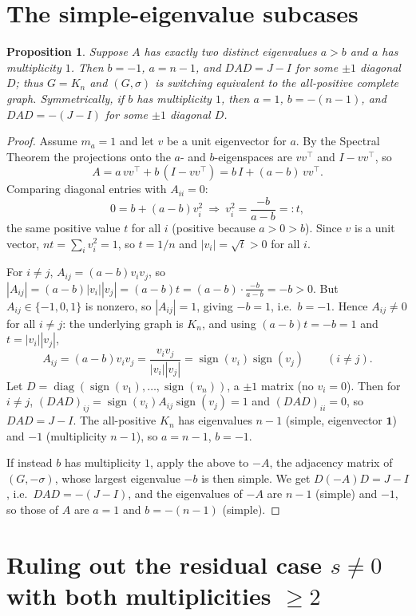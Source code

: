\documentclass{amsart}
\newtheorem{proposition}{Proposition}
\theoremstyle{definition}
\begin{document}
\section{The simple-eigenvalue subcases}\label{sec:simple}

\begin{proposition}\label{prop:simple}
Suppose $A$ has exactly two distinct eigenvalues $a>b$ and $a$ has
multiplicity $1$. Then $b=-1$, $a=n-1$, and $DAD=J-I$ for some $\pm1$ diagonal
$D$; thus $G=K_n$ and $(G,\sigma)$ is switching equivalent to the all-positive
complete graph. Symmetrically, if $b$ has multiplicity $1$, then $a=1$,
$b=-(n-1)$, and $DAD=-(J-I)$ for some $\pm1$ diagonal $D$.
\end{proposition}

\begin{proof}
Assume $m_a=1$ and let $v$ be a unit eigenvector for $a$. By the Spectral
Theorem the projections onto the $a$- and $b$-eigenspaces are $vv^\top$ and
$I-vv^\top$, so
\[
A=a\,vv^\top+b\,(I-vv^\top)=b\,I+(a-b)\,vv^\top .
\]
Comparing diagonal entries with $A_{ii}=0$:
\[
0=b+(a-b)v_i^2\ \Longrightarrow\ v_i^2=\frac{-b}{a-b}=:t,
\]
the same positive value $t$ for all $i$ (positive because $a>0>b$). Since $v$
is a unit vector, $nt=\sum_i v_i^2=1$, so $t=1/n$ and $|v_i|=\sqrt t>0$ for all
$i$.

For $i\ne j$, $A_{ij}=(a-b)v_iv_j$, so
$|A_{ij}|=(a-b)|v_i||v_j|=(a-b)t=(a-b)\cdot\frac{-b}{a-b}=-b>0$. But
$A_{ij}\in\{-1,0,1\}$ is nonzero, so $|A_{ij}|=1$, giving $-b=1$, i.e.\ $b=-1$.
Hence $A_{ij}\ne0$ for all $i\ne j$: the underlying graph is $K_n$, and using
$(a-b)t=-b=1$ and $t=|v_i||v_j|$,
\[
A_{ij}=(a-b)v_iv_j=\frac{v_iv_j}{|v_i||v_j|}
=\operatorname{sign}(v_i)\operatorname{sign}(v_j)\qquad(i\ne j).
\]
Let $D=\operatorname{diag}(\operatorname{sign}(v_1),\dots,
\operatorname{sign}(v_n))$, a $\pm1$ matrix (no $v_i=0$). Then for $i\ne j$,
$(DAD)_{ij}=\operatorname{sign}(v_i)A_{ij}\operatorname{sign}(v_j)=1$ and
$(DAD)_{ii}=0$, so $DAD=J-I$. The all-positive $K_n$ has eigenvalues $n-1$
(simple, eigenvector $\mathbf 1$) and $-1$ (multiplicity $n-1$), so $a=n-1$,
$b=-1$.

If instead $b$ has multiplicity $1$, apply the above to $-A$, the adjacency
matrix of $(G,-\sigma)$, whose largest eigenvalue $-b$ is then simple. We get
$D(-A)D=J-I$, i.e.\ $DAD=-(J-I)$, and the eigenvalues of $-A$ are $n-1$
(simple) and $-1$, so those of $A$ are $a=1$ and $b=-(n-1)$ (simple).
\end{proof}

\section{Ruling out the residual case $s\ne0$ with both multiplicities
\texorpdfstring{$\ge2$}{>=2}}\label{sec:no-residual}
\end{document}
